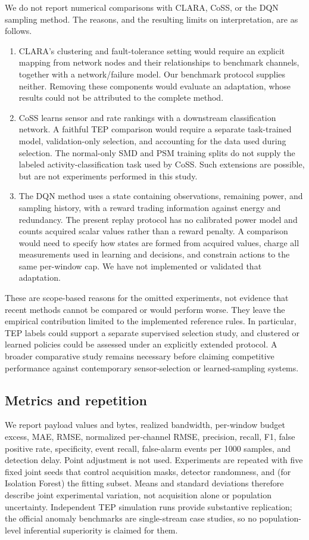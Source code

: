 \documentclass[pdflatex,sn-vancouver-num]{sn-jnl}
\theoremstyle{thmstyleone}
\begin{document}
We do not report numerical comparisons with CLARA, CoSS, or the DQN sampling
method. The reasons, and the resulting limits on interpretation, are as follows.
\begin{enumerate}[leftmargin=*]
\item CLARA's clustering and fault-tolerance setting \cite{harb2024clara} would
require an explicit mapping from network nodes and their relationships to
benchmark channels, together with a network/failure model. Our benchmark
protocol supplies neither. Removing these components would evaluate an
adaptation, whose results could not be attributed to the complete method.
\item CoSS \cite{liu2026coss} learns sensor and rate rankings with a downstream
classification network. A faithful TEP comparison would require a separate
task-trained model, validation-only selection, and accounting for the data
used during selection. The normal-only SMD and PSM training splits do not
supply the labeled activity-classification task used by CoSS. Such extensions
are possible, but are not experiments performed in this study.
\item The DQN method \cite{huang2025dqn} uses a state containing observations,
remaining power, and sampling history, with a reward trading information
against energy and redundancy. The present replay protocol has no calibrated
power model and counts acquired scalar values rather than a reward penalty.
A comparison would need to specify how states are formed from acquired values,
charge all measurements used in learning and decisions, and constrain actions
to the same per-window cap. We have not implemented or validated that adaptation.
\end{enumerate}
These are scope-based reasons for the omitted experiments, not evidence that
recent methods cannot be compared or would perform worse. They leave the
empirical contribution limited to the implemented reference rules. In particular,
TEP labels could support a separate supervised selection study, and clustered
or learned policies could be assessed under an explicitly extended protocol.
A broader comparative study remains necessary before claiming competitive
performance against contemporary sensor-selection or learned-sampling systems.

\subsection{Metrics and repetition}

We report payload values and bytes, realized bandwidth, per-window budget
excess, MAE, RMSE, normalized per-channel RMSE, precision, recall, F1, false
positive rate, specificity, event recall, false-alarm events per 1000 samples,
and detection delay. Point adjustment is not used. Experiments are repeated
with five fixed joint seeds that control acquisition masks, detector randomness,
and (for Isolation Forest) the fitting subset. Means and standard deviations
therefore describe joint experimental variation, not acquisition alone or
population uncertainty. Independent TEP simulation
runs provide substantive replication; the official anomaly benchmarks are
single-stream case studies, so no population-level inferential superiority is
claimed for them.
\end{document}
